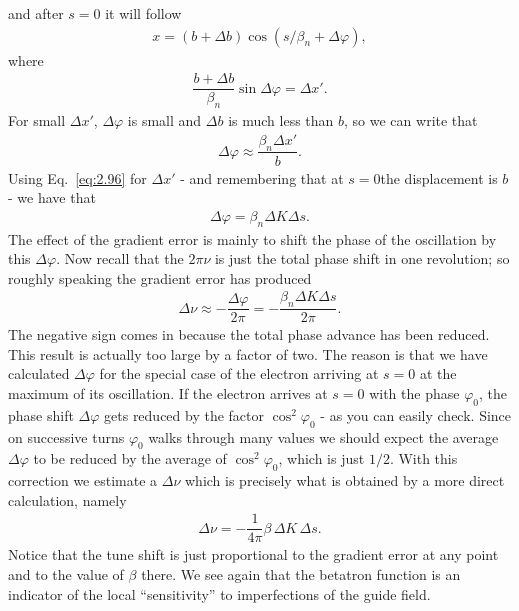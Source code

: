 and after $s = 0$ it will follow
\begin{align}
	x = (b + \Delta b) \cos(s/\beta_n+\Delta\varphi),
\end{align}
where
\begin{align}
	\dfrac{b+\Delta b}{\beta_n} \sin\Delta\varphi = \Delta x'.
\end{align}
For small $\Delta x'$, $\Delta \varphi$ is small and $\Delta b$ is much less than $b$, so we can write that
\begin{align}
	\Delta \varphi \approx \dfrac{\beta_n \Delta x'}{b}.
\end{align}
Using Eq.~\eqref{eq:2.96} for $\Delta x'$ - and remembering that at $s=0$the displacement is $b$ - we have that
\begin{align}
	\Delta \varphi = \beta_n \Delta K \Delta s.
\end{align}
The effect of the gradient error is mainly to shift the phase of the oscillation by this $\Delta \varphi$. Now recall that the $2\pi\nu$ is just the total phase shift in one revolution; so roughly speaking the gradient error has produced
\begin{align}
	\Delta\nu \approx -\dfrac{\Delta\varphi}{2\pi} = - \dfrac{\beta_n \Delta K \Delta s }{2\pi}.
\end{align}
The negative sign comes in because the total phase advance has been reduced.\\
This result is actually too large by a factor of two. The reason is that we have calculated $\Delta \varphi$ for the special case of the electron arriving at $s = 0$ at the maximum
of its oscillation. If the electron arrives at $s = 0$ with the phase $\varphi_0$, the phase
shift $\Delta\varphi$ gets reduced by the factor $\cos^2\varphi_0$ - as you can easily check.
 Since on successive turns $\varphi_0$ walks through many values we should expect the average $\Delta \varphi$ to be reduced by the average of $\cos^2\varphi_0$, which is just $1/2$. With this correction we estimate a $\Delta\nu$ which is precisely what is obtained by a more direct calculation, namely
\begin{align}
	\Delta\nu = -\dfrac{1}{4\pi}\beta\, \Delta K\, \Delta s.
\end{align}
Notice that the tune shift is just proportional to the gradient error at any point and to the value of $\beta$ there. We see again that the betatron function is an indicator of the local ``sensitivity'' to imperfections of the guide field.\\
